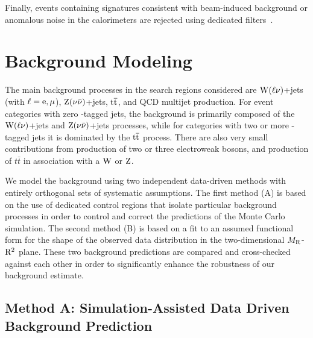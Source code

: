 Finally, events containing signatures consistent with beam-induced background or anomalous noise 
in the calorimeters are rejected using dedicated 
filters~\cite{Chatrchyan:2011tn,Khachatryan:2014gga}.


\section{Background Modeling}
\label{sec:Background}

The main background processes in the search regions considered are
$\mathrm{W}(\ell\nu)$+jets (with $\ell=\mathrm{e},{\mu}$), $\mathrm{Z}(\nu\bar\nu)$+jets, $\mathrm{t}\overline{\mathrm{t}}$, and QCD multijet production. For event categories with
zero \PQb-tagged jets, the background is primarily composed of the $\mathrm{W}(\ell\nu)$+jets and $\mathrm{Z}(\nu\bar\nu)$+jets
processes, while for categories with two or more \PQb-tagged jets it is
dominated by the $\mathrm{t}\overline{\mathrm{t}}$ process. There are also very small contributions from
production of two or three electroweak bosons, and production of $t\bar{t}$ in
association with a $\mathrm{W}$ or $\mathrm{Z}$.

We model the background using two independent data-driven methods with entirely
orthogonal sets of systematic assumptions. The first method (A) is based on the use of 
dedicated control regions that isolate particular background processes in order 
to control and correct the predictions of the Monte Carlo simulation. 
The second method (B) is based on a fit to an assumed functional 
form for the shape of the observed data distribution in the two-dimensional $M_\mathrm{R}$-$\mathrm{R}^2$ plane. 
These two background predictions are compared and cross-checked against each other in order 
to significantly enhance the robustness of our background estimate. 



\subsection{Method A: Simulation-Assisted Data Driven Background Prediction}
\label{sec:MADD}

